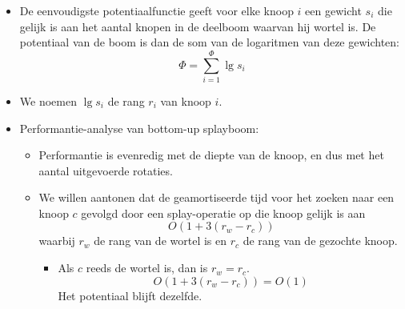 \begin{itemize}
    \item De eenvoudigste potentiaalfunctie geeft voor elke knoop $i$ een gewicht $s_i$ die gelijk is aan het aantal knopen in de deelboom waarvan hij wortel is. De potentiaal van de boom is dan de som van de logaritmen van deze gewichten:
    $$\Phi = \sum_{i=1}^\Phi \lg s_i$$
    \item We noemen $\lg s_i$ de rang $r_i$ van knoop $i$.
    \item Performantie-analyse van bottom-up splayboom:
    \begin{itemize}
        \item Performantie is evenredig met de diepte van de knoop, en dus met het aantal uitgevoerde rotaties.
        \item We willen aantonen dat de geamortiseerde tijd voor het zoeken naar een knoop $c$ gevolgd door een splay-operatie op die knoop gelijk is aan $$O(1 + 3(r_w - r_c))$$
        waarbij $r_w$ de rang van de wortel is en $r_c$ de rang van de gezochte knoop.
        \begin{itemize}
            \item Als $c$ reeds de wortel is, dan is $r_w = r_c$.
            $$O(1 + 3(r_w - r_c)) = O(1)$$
            Het potentiaal blijft dezelfde.
        \end{itemize}
    \end{itemize}
\end{itemize}

